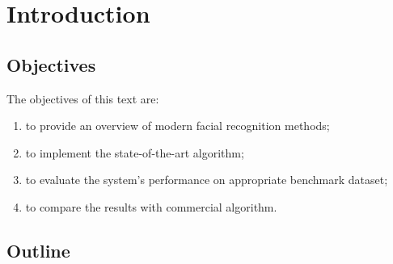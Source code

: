 \chapter{Introduction}\label{ch:introduction}

\section{Objectives}\label{sec:objectives}
The objectives of this text are:
\begin{enumerate}
    \item to provide an overview of modern facial recognition methods;
    \item to implement the state-of-the-art algorithm;
    \item to evaluate the system's performance on appropriate benchmark dataset;
    \item to compare the results with commercial algorithm.
\end{enumerate}

\section{Outline}\label{sec:outline}